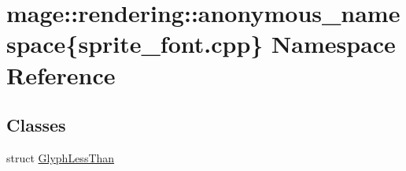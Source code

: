 \hypertarget{namespacemage_1_1rendering_1_1anonymous__namespace_02sprite__font_8cpp_03}{}\section{mage\+:\+:rendering\+:\+:anonymous\+\_\+namespace\{sprite\+\_\+font.\+cpp\} Namespace Reference}
\label{namespacemage_1_1rendering_1_1anonymous__namespace_02sprite__font_8cpp_03}
\subsection*{Classes}
\begin{DoxyCompactItemize}
\item 
struct \mbox{\hyperlink{structmage_1_1rendering_1_1anonymous__namespace_02sprite__font_8cpp_03_1_1_glyph_less_than}{Glyph\+Less\+Than}}
\end{DoxyCompactItemize}
